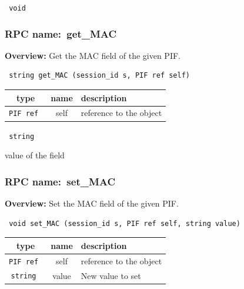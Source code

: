 \vspace{0.3cm}

{\tt 
void
}



\vspace{0.3cm}
\vspace{0.3cm}
\vspace{0.3cm}
\subsubsection{RPC name:~get\_MAC}

{\bf Overview:} 
Get the MAC field of the given PIF.

\begin{verbatim} string get_MAC (session_id s, PIF ref self)\end{verbatim}



 
\vspace{0.3cm}
\begin{tabular}{|c|c|p{7cm}|}
 \hline
{\bf type} & {\bf name} & {\bf description} \\ \hline
{\tt PIF ref } & self & reference to the object \\ \hline 

\end{tabular}

\vspace{0.3cm}

{\tt 
string
}


value of the field
\vspace{0.3cm}
\vspace{0.3cm}
\vspace{0.3cm}
\subsubsection{RPC name:~set\_MAC}

{\bf Overview:} 
Set the MAC field of the given PIF.

\begin{verbatim} void set_MAC (session_id s, PIF ref self, string value)\end{verbatim}



 
\vspace{0.3cm}
\begin{tabular}{|c|c|p{7cm}|}
 \hline
{\bf type} & {\bf name} & {\bf description} \\ \hline
{\tt PIF ref } & self & reference to the object \\ \hline 

{\tt string } & value & New value to set \\ \hline 

\end{tabular}

